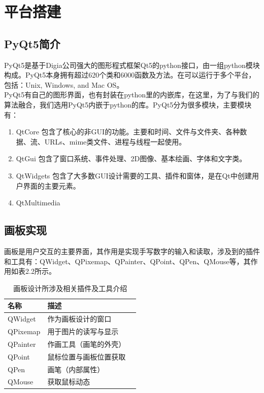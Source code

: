 \documentclass[UTF8, a4paper, 12pt]{report}
\begin{document}
	\section{平台搭建}
		\subsection{PyQt5简介}
			PyQt5是基于Digia公司强大的图形程式框架Qt5的python接口，由一组python模块构成。PyQt5本身拥有超过620个类和6000函数及方法。在可以运行于多个平台，包括：Unix, Windows, and Mac OS。\\
			PyQt5有自己的图形界面，也有封装在python里的内嵌库，在这里，为了与我们的算法融合，我们选用PyQt5内嵌于python的库。PyQt5分为很多模块，主要模块有：
			\begin{enumerate}[itemindent=1em]
				\renewcommand{\labelenumi}{•}
				\item QtCore 包含了核心的非GUI的功能。主要和时间、文件与文件夹、各种数据、流、URLs、mime类文件、进程与线程一起使用。
				\item QtGui 包含了窗口系统、事件处理、2D图像、基本绘画、字体和文字类。
				\item QtWidgets 包含了大多数GUI设计需要的工具、插件和窗体，是在Qt中创建用户界面的主要元素。
				\item QtMultimedia
			\end{enumerate}

		\subsection{画板实现}
			画板是用户交互的主要界面，其作用是实现手写数字的输入和读取，涉及到的插件和工具有：QWidget、QPixemap、QPainter、QPoint、QPen、QMouse等，其作用如表2.2所示。
			\begin{table}[!h]
			\centering
			\caption{画板设计所涉及相关插件及工具介绍}  
			\begin{tabular*}{13cm}{lll}  
			\hline  
			名称 & 描述 \\  
			\hline  
			\hline
			QWidget  & 作为画板设计的窗口 \\  
			QPixemap  & 用于图片的读写与显示 \\  
			QPainter & 作画工具（画笔的外壳）\\
			QPoint & 鼠标位置与画板位置获取\\  
			QPen & 画笔（内部属性）\\
			QMouse & 获取鼠标动态\\
			\hline  
			\end{tabular*}  
			\end{table}  
		
\end{document}
